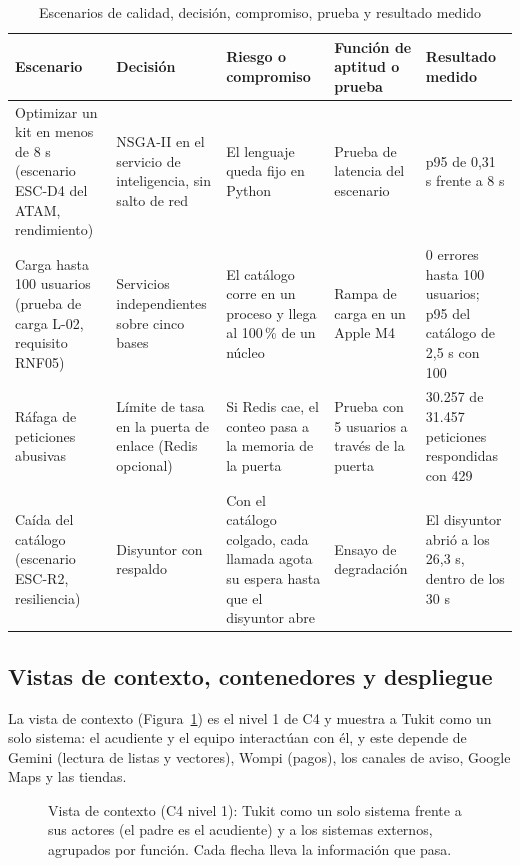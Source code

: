 \begin{table}[!htb]
\centering
\caption{Escenarios de calidad, decisión, compromiso, prueba y resultado medido}
\label{tab:escenarios}
\footnotesize
\setlength{\tabcolsep}{3pt}
\begin{tabular}{@{}p{2.4cm}p{2.7cm}p{3.0cm}p{2.9cm}p{2.9cm}@{}}
\toprule
\textbf{Escenario} & \textbf{Decisión} & \textbf{Riesgo o compromiso} & \textbf{Función de aptitud o prueba} & \textbf{Resultado medido} \\
\midrule
Optimizar un kit en menos de 8 s (escenario ESC-D4 del ATAM, rendimiento) & NSGA-II en el servicio de inteligencia, sin salto de red & El lenguaje queda fijo en Python & Prueba de latencia del escenario & p95 de 0,31 s frente a 8 s \\
\addlinespace
Carga hasta 100 usuarios (prueba de carga L-02, requisito RNF05) & Servicios independientes sobre cinco bases & El catálogo corre en un proceso y llega al 100\,\% de un núcleo & Rampa de carga en un Apple M4 & 0 errores hasta 100 usuarios; p95 del catálogo de 2,5 s con 100 \\
\addlinespace
Ráfaga de peticiones abusivas & Límite de tasa en la puerta de enlace (Redis opcional) & Si Redis cae, el conteo pasa a la memoria de la puerta & Prueba con 5 usuarios a través de la puerta & 30.257 de 31.457 peticiones respondidas con 429 \\
\addlinespace
Caída del catálogo (escenario ESC-R2, resiliencia) & Disyuntor con respaldo & Con el catálogo colgado, cada llamada agota su espera hasta que el disyuntor abre & Ensayo de degradación & El disyuntor abrió a los 26,3 s, dentro de los 30 s \\
\bottomrule
\end{tabular}
\end{table}

\subsection{Vistas de contexto, contenedores y despliegue}
\label{sec:vistas}

La vista de contexto (Figura~\ref{fig:c4-contexto}) es el nivel 1 de C4 y muestra a Tukit como un solo sistema: el acudiente y el equipo interactúan con él, y este depende de Gemini (lectura de listas y vectores), Wompi (pagos), los canales de aviso, Google Maps y las tiendas.

\begin{figure}[!htb]
\centering
\resizebox{\textwidth}{!}{}
\caption[Vista de contexto: Tukit frente a sus actores y sistemas externos.]{Vista de contexto
(C4 nivel 1): Tukit como un solo sistema frente a sus actores (el padre es el acudiente) y a los
sistemas externos, agrupados por función. Cada flecha lleva la información que pasa.}
\label{fig:c4-contexto}
\end{figure}

